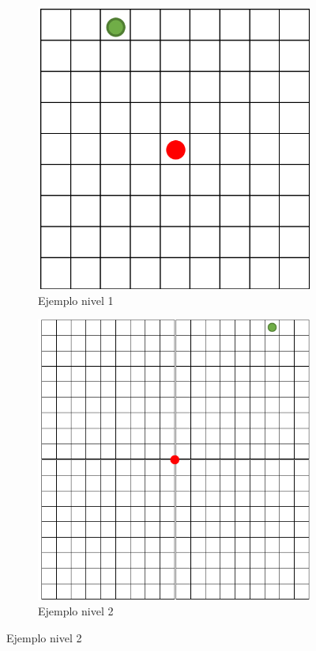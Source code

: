 \documentclass{article}
\begin{document}
\begin{figure}[h!]
    \centering
    \begin{subfigure}[b]{0.45\linewidth}
        \includegraphics[width=\linewidth]{figura1.png}
        \caption{Ejemplo nivel 1}
        \label{fig:figura1}
    \end{subfigure}

    \begin{subfigure}[b]{0.45\linewidth}
        \includegraphics[width=\linewidth]{figura3.png}
        \caption{Ejemplo nivel 2}
        \label{fig:figura3}
    \end{subfigure}
\end{figure}
\end{document}
